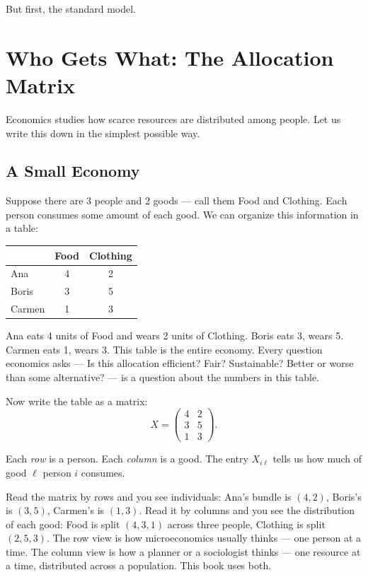 \documentclass[../structural_economics_book.tex]{subfiles}
\begin{document}
But first, the standard model.


\section{Who Gets What: The Allocation Matrix}
\label{ch01:sec:allocation}

Economics studies how scarce resources are distributed among people. Let us write this down in the simplest possible way.

\subsection{A Small Economy}

Suppose there are 3 people and 2 goods --- call them Food and Clothing. Each person consumes some amount of each good. We can organize this information in a table:

\begin{center}
\begin{tabular}{lcc}
\toprule
& Food & Clothing \\
\midrule
Ana & 4 & 2 \\
Boris & 3 & 5 \\
Carmen & 1 & 3 \\
\bottomrule
\end{tabular}
\end{center}

Ana eats 4 units of Food and wears 2 units of Clothing. Boris eats 3, wears 5. Carmen eats 1, wears 3. This table is the entire economy. Every question economics asks --- Is this allocation efficient? Fair? Sustainable? Better or worse than some alternative? --- is a question about the numbers in this table.

Now write the table as a matrix:
\begin{equation}\label{ch01:eq:X_example}
X = \begin{pmatrix} 4 & 2 \\ 3 & 5 \\ 1 & 3 \end{pmatrix}.
\end{equation}

Each \textit{row} is a person. Each \textit{column} is a good. The entry $X_{i\ell}$ tells us how much of good $\ell$ person $i$ consumes.

\begin{intuition}
Read the matrix by rows and you see individuals: Ana's bundle is $(4, 2)$, Boris's is $(3, 5)$, Carmen's is $(1, 3)$. Read it by columns and you see the distribution of each good: Food is split $(4, 3, 1)$ across three people, Clothing is split $(2, 5, 3)$. The row view is how microeconomics usually thinks --- one person at a time. The column view is how a planner or a sociologist thinks --- one resource at a time, distributed across a population. This book uses both.
\end{intuition}
\end{document}
